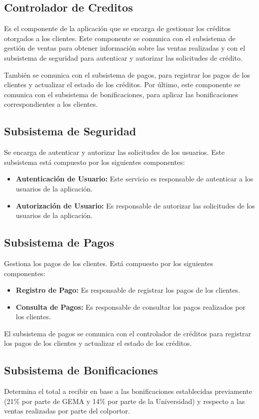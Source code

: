 \documentclass[runningheads]{llncs}
\begin{document}
\subsection*{Controlador de Creditos}
Es el componente de la aplicación que se encarga de gestionar los créditos otorgados a los clientes. Este componente se comunica con el subsistema de gestión de ventas para obtener información sobre las ventas realizadas y con el subsistema de seguridad para autenticar y autorizar las solicitudes de crédito.

También se comunica con el subsistema de pagos, para registrar los pagos de los clientes y actualizar el estado de los créditos. Por último, este componente se comunica con el subsistema de bonificaciones, para aplicar las bonificaciones correspondientes a los clientes.

\subsection*{Subsistema de Seguridad}
Se encarga de autenticar y autorizar las solicitudes de los usuarios. Este subsistema está compuesto por los siguientes componentes:
\begin{itemize}
    \item \textbf{Autenticación de Usuario:}  Este servicio es responsable de autenticar a los usuarios de la aplicación.
    \item \textbf{Autorización de Usuario:} Es responsable de autorizar las solicitudes de los usuarios de la aplicación.
\end{itemize}

\subsection*{Subsistema de Pagos}
Gestiona los pagos de los clientes. Está compuesto por los siguientes componentes:
\begin{itemize}
    \item \textbf{Registro de Pago:}  Es responsable de registrar los pagos de los clientes.
    \item \textbf{Consulta de Pagos:} Es responsable de consultar los pagos realizados por los clientes.
\end{itemize}
El subsistema de pagos se comunica con el controlador de créditos para registrar los pagos de los clientes y actualizar el estado de los créditos.
\subsection*{Subsistema de Bonificaciones}
Determina el total a recibir en base a las bonificaciones establecidas previamente (21\% por parte de GEMA y 14\% por parte de la Universidad) y respecto a las ventas realizadas por parte del colportor.
\end{document}
